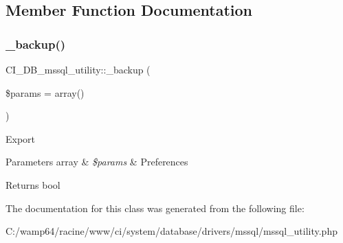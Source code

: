 \subsection{Member Function Documentation}
\mbox{\label{class_c_i___d_b__mssql__utility_a9ea0ba3b9d0e7829010bcd3601dbb60f}} 
\subsubsection{\texorpdfstring{\+\_\+backup()}{\_backup()}}
{\footnotesize\ttfamily C\+I\+\_\+\+D\+B\+\_\+mssql\+\_\+utility\+::\+\_\+backup (\begin{DoxyParamCaption}\item[{}]{\$params = {\ttfamily array()} }\end{DoxyParamCaption})\hspace{0.3cm}{\ttfamily [protected]}}

Export


\begin{DoxyParams}[1]{Parameters}
array & {\em \$params} & Preferences \\
\hline
\end{DoxyParams}
\begin{DoxyReturn}{Returns}
bool 
\end{DoxyReturn}


The documentation for this class was generated from the following file\+:\begin{DoxyCompactItemize}
\item 
C\+:/wamp64/racine/www/ci/system/database/drivers/mssql/mssql\+\_\+utility.\+php\end{DoxyCompactItemize}
